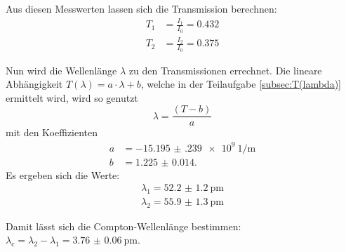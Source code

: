   \noindent Aus diesen Messwerten lassen sich die Transmission berechnen:
  \begin{align*}
    T_1 &= \frac{I_1}{I_0} = \num{0.432}\\
    T_2 &= \frac{I_2}{I_0} = \num{0.375}
  \end{align*}

  \noindent Nun wird die Wellenlänge $\lambda$ zu den Transmissionen errechnet. Die lineare Abhängigkeit $T(\lambda) = a \cdot \lambda + b $, 
  welche in der Teilaufgabe \ref{subsec:T(lambda)} ermittelt wird, wird so genutzt
  \begin{equation*}
    \lambda = \frac{(T - b)}{a}
  \end{equation*}
  mit den Koeffizienten
  \begin{align*}
    a &= \SI{-15.195(239)e9}{1\per\metre}\\
    b &= \num{1.225(14)}.
  \end{align*}
  Es ergeben sich die Werte:
  \begin{align*}
    \lambda_1 = \SI{52.2(12)}{\pico\metre}\\
    \lambda_2 = \SI{55.9(13)}{\pico\metre}
  \end{align*}

  \noindent Damit lässt sich die Compton-Wellenlänge bestimmen: $\lambda_{\text{c}} = \lambda_2 - \lambda_1 = \SI{3.76(6)}{\pico\metre}$. 


